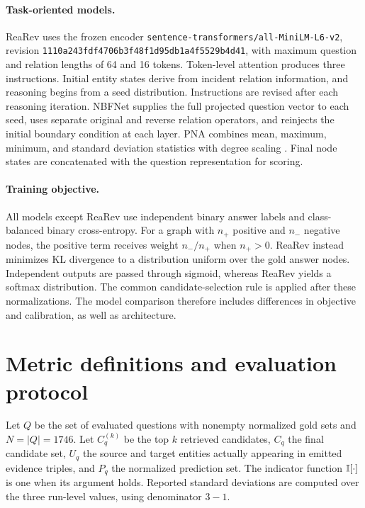 \paragraph{Task-oriented models.}
ReaRev uses the frozen encoder \texttt{sentence-transformers/all-MiniLM-L6-v2}, revision \texttt{1110a243fdf4706b3f48f1d95db1a4f5529b4d41}, with maximum question and relation lengths of 64 and 16 tokens. Token-level attention produces three instructions. Initial entity states derive from incident relation information, and reasoning begins from a seed distribution. Instructions are revised after each reasoning iteration. NBFNet supplies the full projected question vector to each seed, uses separate original and reverse relation operators, and reinjects the initial boundary condition at each layer. PNA combines mean, maximum, minimum, and standard deviation statistics with degree scaling \citep{corso2020pna}. Final node states are concatenated with the question representation for scoring.

\paragraph{Training objective.}
All models except ReaRev use independent binary answer labels and class-balanced binary cross-entropy. For a graph with $n_+$ positive and $n_-$ negative nodes, the positive term receives weight $n_-/n_+$ when $n_+>0$. ReaRev instead minimizes KL divergence to a distribution uniform over the gold answer nodes. Independent outputs are passed through sigmoid, whereas ReaRev yields a softmax distribution. The common candidate-selection rule is applied after these normalizations. The model comparison therefore includes differences in objective and calibration, as well as architecture.

\section{Metric definitions and evaluation protocol}
\label{app:metrics}

Let $Q$ be the set of evaluated questions with nonempty normalized gold sets and $N=|Q|=1746$. Let $C_q^{(k)}$ be the top $k$ retrieved candidates, $C_q$ the final candidate set, $U_q$ the source and target entities actually appearing in emitted evidence triples, and $P_q$ the normalized prediction set. The indicator function $\mathbb{I}[\cdot]$ is one when its argument holds. Reported standard deviations are computed over the three run-level values, using denominator $3-1$.

